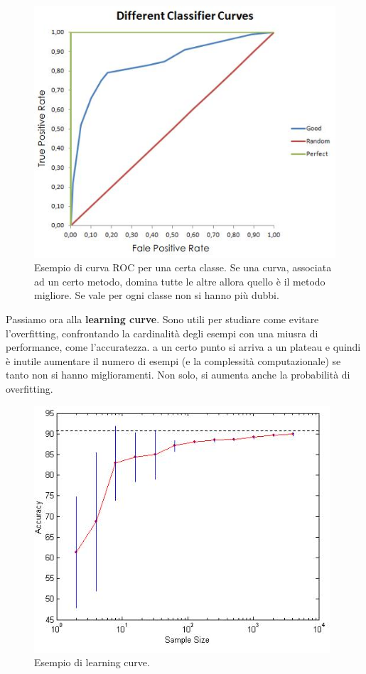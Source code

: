 \begin{figure}
  \centering
  \includegraphics[scale = 0.5]{img/roc.jpg}
  \caption{Esempio di curva ROC per una certa classe. Se una curva, associata ad
    un certo metodo, domina tutte le altre allora quello è il metodo
    migliore. Se vale per ogni classe non si hanno più dubbi.}
  \label{fig:roc}
\end{figure}
Passiamo ora alla \textbf{learning curve}. Sono utili per studiare come evitare
l'overfitting, confrontando la cardinalità degli esempi con una miusra di
performance, come l'accuratezza. a un certo punto si arriva a un plateau e
quindi è inutile aumentare il numero di esempi (e la complessità computazionale)
se tanto non si hanno miglioramenti. Non solo, si aumenta anche la probabilità
di overfitting. 
\begin{figure}
  \centering
  \includegraphics[scale = 0.5]{img/lc.jpg}
  \caption{Esempio di learning curve.}
  \label{fig:roc}
\end{figure}
